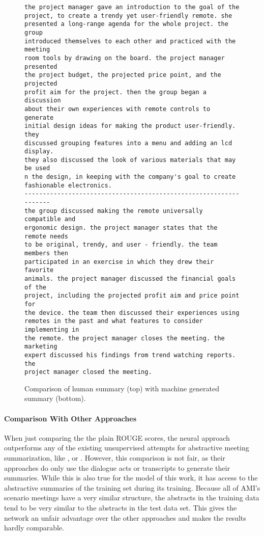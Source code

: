 \begin{figure}[h]
\begin{lstlisting}[numbers=none]
the project manager gave an introduction to the goal of the
project, to create a trendy yet user-friendly remote. she
presented a long-range agenda for the whole project. the group
introduced themselves to each other and practiced with the meeting
room tools by drawing on the board. the project manager presented
the project budget, the projected price point, and the projected
profit aim for the project. then the group began a discussion
about their own experiences with remote controls to generate
initial design ideas for making the product user-friendly. they
discussed grouping features into a menu and adding an lcd display.
they also discussed the look of various materials that may be used 
n the design, in keeping with the company's goal to create
fashionable electronics. 
------------------------------------------------------------------
the group discussed making the remote universally compatible and
ergonomic design. the project manager states that the remote needs
to be original, trendy, and user - friendly. the team members then
participated in an exercise in which they drew their favorite
animals. the project manager discussed the financial goals of the
project, including the projected profit aim and price point for
the device. the team then discussed their experiences using
remotes in the past and what features to consider implementing in
the remote. the project manager closes the meeting. the marketing
expert discussed his findings from trend watching reports. the
project manager closed the meeting. 
\end{lstlisting}
\caption{Comparison of human summary (top) with machine generated summary (bottom).}
\label{fig:extended-experiment-example}
\end{figure}

\paragraph{Comparison With Other Approaches}

When just comparing the the plain ROUGE scores, the neural approach outperforms any of the existing unsupervised attempts for abstractive meeting summarization, like \cite{oya-etal-2014-template}, \cite{1609.07035} or \cite{shang-etal-2018-unsupervised}. %
However, this comparison is not fair, as their approaches do only use the dialogue acts or transcripts to generate their summaries.
While this is also true for the model of this work, it has access to the abstractive summaries of the training set during its training.
Because all of AMI's scenario meetings have a very similar structure, the abstracts in the training data tend to be very similar to the abstracts in the test data set.
This gives the network an unfair advantage over the other approaches and makes the results hardly comparable.

